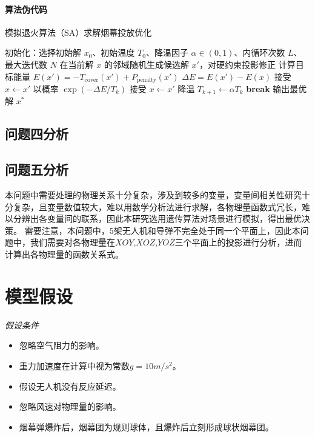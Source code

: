 \documentclass{article}
\begin{document}
\paragraph{算法伪代码}
\begin{algorithm}[H]
\caption{模拟退火算法（SA）求解烟幕投放优化}
\begin{algorithmic}[1]
\State 初始化：选择初始解 $x_0$、初始温度 $T_0$、降温因子 $\alpha\in(0,1)$、内循环次数 $L$、最大迭代数 $N$
    \State 在当前解 $x$ 的邻域随机生成候选解 $x'$，对硬约束投影修正
    \State 计算目标能量 $E(x')=-T_{\mathrm{cover}}(x')+P_{\mathrm{penalty}}(x')$
    \State $\Delta E=E(x')-E(x)$
     接受 $x\leftarrow x'$
    \Else \State 以概率 $\exp(-\Delta E/T_k)$ 接受 $x\leftarrow x'$
    \EndIf
  \EndFor
  \State 降温 $T_{k+1}\leftarrow \alpha T_k$
   \textbf{break}
  \EndIf
\EndFor
\State 输出最优解 $x^*$
\end{algorithmic}
\end{algorithm}
\subsection{问题四分析}

\subsection{问题五分析}
本问题中需要处理的物理关系十分复杂，涉及到较多的变量，变量间相关性研究十分复杂，且变量数值较大，难以用数学分析法进行求解，各物理量函数式冗长，难以分辨出各变量间的联系，因此本研究选用遗传算法对场景进行模拟，得出最优决策。
需要注意，本问题中，5架无人机和导弹不完全处于同一个平面上，因此本问题中，我们需要对各物理量在$XOY$,$XOZ$,$YOZ$三个平面上的投影进行分析，进而计算出各物理量的函数关系式。

\section{模型假设}

\textit{假设条件}
\begin{itemize}
    \item 忽略空气阻力的影响。
    \item 重力加速度在计算中视为常数$g = 10m/s^2$。
    \item 假设无人机没有反应延迟。
    \item 忽略风速对物理量的影响。
    \item 烟幕弹爆炸后，烟幕团为规则球体，且爆炸后立刻形成球状烟幕团。
\end{itemize}
\end{document}
